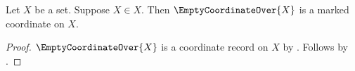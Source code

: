 

\begin{classification}\label{empty_coordinate_marked}
    Let $X$ be a set.
    Suppose $X\in X$.
    Then $\EmptyCoordinateOver{X}$ is a marked coordinate on $X$.
\end{classification}
\begin{proof}
    $\EmptyCoordinateOver{X}$ is a coordinate record on $X$
        by .
    Follows by .
\end{proof}
